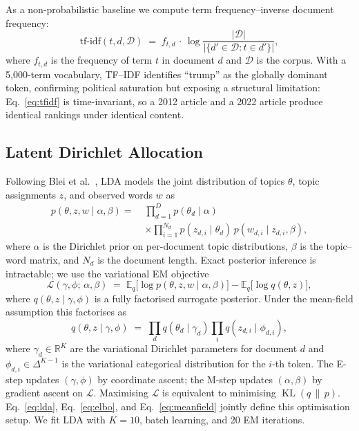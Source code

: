 \documentclass[10pt,twocolumn,a4paper]{article}
\DeclareMathOperator{\KL}{KL}
\newcommand{\R}{\mathbb{R}}
\newcommand{\E}{\mathbb{E}}
\begin{document}
As a non-probabilistic baseline we compute term frequency--inverse document frequency:
\begin{equation}
\label{eq:tfidf}
\text{tf-idf}(t, d, \mathcal{D}) \;=\; f_{t,d}\,\cdot\,\log\!\frac{|\mathcal{D}|}{|\{d' \in \mathcal{D} : t \in d'\}|},
\end{equation}
where $f_{t,d}$ is the frequency of term $t$ in document $d$ and $\mathcal{D}$ is the corpus. With a 5{,}000-term vocabulary, TF--IDF identifies ``trump'' as the globally dominant token, confirming political saturation but exposing a structural limitation: Eq.~\eqref{eq:tfidf} is time-invariant, so a 2012 article and a 2022 article produce identical rankings under identical content.

\subsection{Latent Dirichlet Allocation}
\label{sec:lda}

Following Blei et al.~\cite{blei2003}, LDA models the joint distribution of topics $\theta$, topic assignments $z$, and observed words $w$ as
\begin{equation}
\label{eq:lda}
\begin{aligned}
p(\theta, z, w \mid \alpha, \beta) =\; & \prod_{d=1}^{D} p(\theta_d \mid \alpha) \\
 & \times \prod_{i=1}^{N_d} p(z_{d,i} \mid \theta_d)\,p(w_{d,i} \mid z_{d,i}, \beta),
\end{aligned}
\end{equation}
where $\alpha$ is the Dirichlet prior on per-document topic distributions, $\beta$ is the topic--word matrix, and $N_d$ is the document length. Exact posterior inference is intractable; we use the variational EM objective
\begin{equation}
\label{eq:elbo}
\mathcal{L}(\gamma, \phi;\, \alpha, \beta) \;=\; \E_q\!\bigl[\log p(\theta, z, w \mid \alpha, \beta)\bigr] - \E_q\!\bigl[\log q(\theta, z)\bigr],
\end{equation}
where $q(\theta,z \mid \gamma,\phi)$ is a fully factorised surrogate posterior. Under the mean-field assumption this factorises as
\begin{equation}
\label{eq:meanfield}
q(\theta, z \mid \gamma, \phi) \;=\; \prod_{d} q(\theta_d \mid \gamma_d)\prod_{i} q(z_{d,i} \mid \phi_{d,i}),
\end{equation}
where $\gamma_d \in \R^K$ are the variational Dirichlet parameters for document $d$ and $\phi_{d,i} \in \Delta^{K-1}$ is the variational categorical distribution for the $i$-th token. The E-step updates $(\gamma, \phi)$ by coordinate ascent; the M-step updates $(\alpha, \beta)$ by gradient ascent on $\mathcal{L}$. Maximising $\mathcal{L}$ is equivalent to minimising $\KL(q \,\|\, p)$. Eq.~\eqref{eq:lda}, Eq.~\eqref{eq:elbo}, and Eq.~\eqref{eq:meanfield} jointly define this optimisation setup. We fit LDA with $K=10$, batch learning, and 20 EM iterations.
\end{document}
